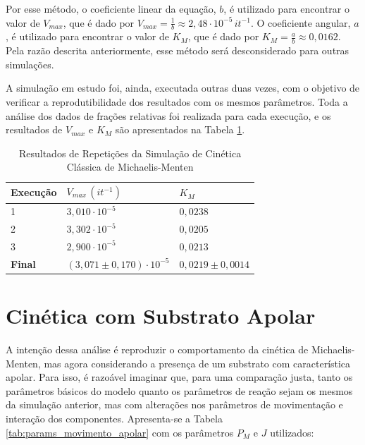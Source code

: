 \documentclass[12pt,oneside]{report}
\begin{document}
Por esse método, o coeficiente linear da equação, $b$, é utilizado para encontrar o valor de $V_{max}$, que é dado por $V_{max} = \frac{1}{b} \approx 2{,}48 \cdot 10^{-5} \, it^{-1}$. O coeficiente angular, $a$, é utilizado para encontrar o valor de $K_M$, que é dado por $K_M = \frac{a}{b} \approx 0{,}0162$. Pela razão descrita anteriormente, esse método será desconsiderado para outras simulações.

A simulação em estudo foi, ainda, executada outras duas vezes, com o objetivo de verificar a reprodutibilidade dos resultados com os mesmos parâmetros. Toda a análise dos dados de frações relativas foi realizada para cada execução, e os resultados de $V_{max}$ e $K_M$ são apresentados na Tabela \ref{tab:params_MM_repeticoes}.

\begin{table}[H]
    \centering
    \caption{Resultados de Repetições da Simulação de Cinética Clássica de Michaelis-Menten}
    \vspace{0.2cm}
    \begin{tabularx}{\textwidth}{X X m{5cm}}
        \hline
        \textbf{Execução} & \textbf{$V_{max} \, (it^{-1})$ }      & \textbf{$K_M$}          \\
        \hline
        1                 & $3{,}010 \cdot 10^{-5}$               & $0{,}0238$              \\
        2                 & $3{,}302 \cdot 10^{-5}$               & $0{,}0205$              \\
        3                 & $2{,}900 \cdot 10^{-5}$               & $0{,}0213$              \\
        \hline
        \textbf{Final}    & $(3{,}071 \pm 0{,}170) \cdot 10^{-5}$ & $0{,}0219 \pm 0{,}0014$ \\
        \hline
    \end{tabularx}
    \vspace{0.2cm}
    \label{tab:params_MM_repeticoes}
\end{table}

\section{Cinética com Substrato Apolar}

A intenção dessa análise é reproduzir o comportamento da cinética de Michaelis-Menten, mas agora considerando a presença de um substrato com característica apolar. Para isso, é razoável imaginar que, para uma comparação justa, tanto os parâmetros básicos do modelo quanto os parâmetros de reação sejam os mesmos da simulação anterior, mas com alterações nos parâmetros de movimentação e interação dos componentes. Apresenta-se a Tabela \ref{tab:params_movimento_apolar} com os parâmetros $P_M$ e $J$ utilizados:
\end{document}
